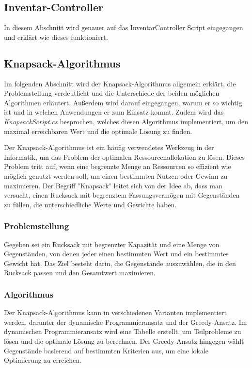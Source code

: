 \subsection{Inventar-Controller}
In diesem Abschnitt wird genauer auf das InventarController Script eingegangen und erklärt wie dieses funktioniert.


\subsection{Knapsack-Algorithmus}
Im folgenden Abschnitt wird der Knapsack-Algorithmus allgemein erklärt, die Problemstellung verdeutlicht und die
Unterschiede der beiden möglichen Algorithmen erläutert. Außerdem wird darauf eingegangen, warum er so wichtig ist
und in welchen Anwendungen er zum Einsatz kommt. Zudem wird das \textit{KnapsackScript.cs} besprochen, welches
diesen Algorithmus implementiert, um den maximal erreichbaren Wert und die optimale Lösung zu finden.

Der Knapsack-Algorithmus ist ein häufig verwendetes Werkzeug in der Informatik, um das Problem der optimalen
Ressourcenallokation zu lösen. Dieses Problem tritt auf, wenn eine begrenzte Menge an Ressourcen so effizient wie
möglich genutzt werden soll, um einen bestimmten Nutzen oder Gewinn zu maximieren. Der Begriff "Knapsack" leitet sich
von der Idee ab, dass man versucht, einen Rucksack mit begrenztem Fassungsvermögen mit Gegenständen zu füllen, die
unterschiedliche Werte und Gewichte haben.

\subsubsection{Problemstellung}
Gegeben sei ein Rucksack mit begrenzter Kapazität und eine Menge von Gegenständen, von denen jeder einen bestimmten
Wert und ein bestimmtes Gewicht hat. Das Ziel besteht darin, die Gegenstände auszuwählen, die in den Rucksack passen
und den Gesamtwert maximieren.

\subsubsection{Algorithmus}
Der Knapsack-Algorithmus kann in verschiedenen Varianten implementiert werden, darunter der dynamische
Programmieransatz und der Greedy-Ansatz. Im dynamischen Programmieransatz wird eine Tabelle erstellt, um
Teilprobleme zu lösen und die optimale Lösung zu berechnen. Der Greedy-Ansatz hingegen wählt Gegenstände basierend
auf bestimmten Kriterien aus, um eine lokale Optimierung zu erreichen.

